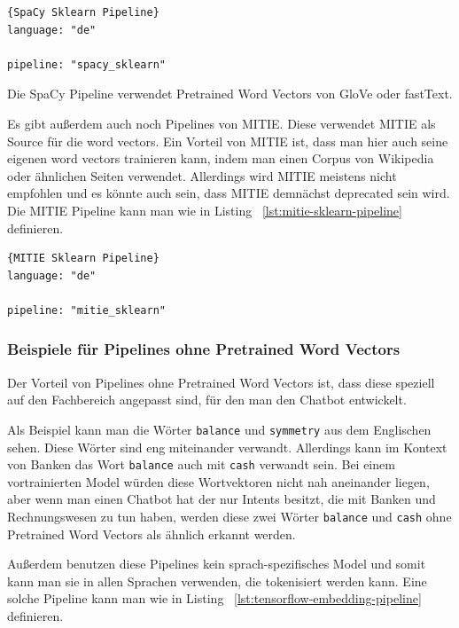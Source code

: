 \begin{lstlisting}[label={lst:spacy-sklearn-pipeline},caption={SpaCy Sklearn Pipeline}]{SpaCy Sklearn Pipeline}
language: "de"

pipeline: "spacy_sklearn"
\end{lstlisting}

Die SpaCy Pipeline verwendet Pretrained Word Vectors von GloVe oder fastText.\cite{spacySklearnPipeline, spacyNLP, rasaMasterclassPreConfiguredPipelines}

Es gibt außerdem auch noch Pipelines von MITIE.
Diese verwendet MITIE als Source für die word vectors.
Ein Vorteil von MITIE ist, dass man hier auch seine eigenen word vectors trainieren kann, indem man einen Corpus von Wikipedia oder ähnlichen Seiten verwendet.
Allerdings wird MITIE meistens nicht empfohlen und es könnte auch sein, dass MITIE demnächst deprecated sein wird.
Die MITIE Pipeline kann man wie in Listing ~\ref{lst:mitie-sklearn-pipeline} definieren.\cite{mitieNLP, mitieDeprecated}

\begin{lstlisting}[label={lst:mitie-sklearn-pipeline},caption={MITIE Sklearn Pipeline}]{MITIE Sklearn Pipeline}
language: "de"

pipeline: "mitie_sklearn"
\end{lstlisting}

\subsubsection{Beispiele für Pipelines ohne Pretrained Word Vectors}

Der Vorteil von Pipelines ohne Pretrained Word Vectors ist, dass diese speziell auf den Fachbereich angepasst sind, für den man den Chatbot entwickelt.\cite{pretrainedVsSupervised, tensorFlowEmbedding}

Als Beispiel kann man die Wörter \texttt{balance} und \texttt{symmetry} aus dem Englischen sehen.
Diese Wörter sind eng miteinander verwandt.
Allerdings kann im Kontext von Banken das Wort \texttt{balance} auch mit \texttt{cash} verwandt sein.
Bei einem vortrainierten Model würden diese Wortvektoren nicht nah aneinander liegen, aber wenn man einen Chatbot hat der nur Intents besitzt, die mit Banken und Rechnungswesen zu tun haben, werden diese zwei Wörter \texttt{balance} und \texttt{cash} ohne Pretrained Word Vectors als ähnlich erkannt werden.\cite{tensorFlowEmbedding}

Außerdem benutzen diese Pipelines kein sprach-spezifisches Model und somit kann man sie in allen Sprachen verwenden, die tokenisiert werden kann.
Eine solche Pipeline kann man wie in Listing ~\ref{lst:tensorflow-embedding-pipeline} definieren.\cite{tensorFlowEmbedding}

